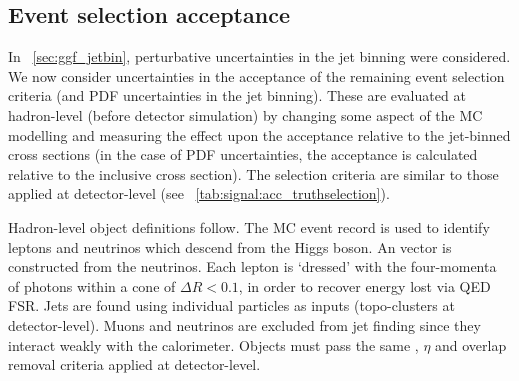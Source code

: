 \subsection{Event selection acceptance}
\label{sec:ggF:acc}

In \Section~\ref{sec:ggf_jetbin}, perturbative uncertainties in the jet binning were 
considered. We now consider uncertainties in the acceptance of the remaining event 
selection criteria (and PDF uncertainties in the jet binning). These 
are evaluated at hadron-level (\ie before detector simulation) by changing some aspect of 
the MC modelling and measuring the effect upon the acceptance relative to the jet-binned 
cross sections (in the case of PDF uncertainties, the acceptance is calculated relative to 
the inclusive cross section). The selection criteria are similar to those applied at 
detector-level (see \Table~\ref{tab:signal:acc_truthselection}).

Hadron-level object definitions follow. The MC event record is used to identify leptons 
and neutrinos which descend from the Higgs boson. An \metvec vector is constructed from 
the neutrinos. Each lepton is `dressed' with the four-momenta of photons within a cone of 
$\Delta R < 0.1$, in order to recover energy lost via QED FSR. Jets are found using 
individual particles as inputs (\cf topo-clusters at detector-level). Muons and neutrinos 
are excluded from jet finding since they interact weakly with the calorimeter. Objects 
must pass the same \pt, $\eta$ and overlap removal criteria applied at detector-level.

